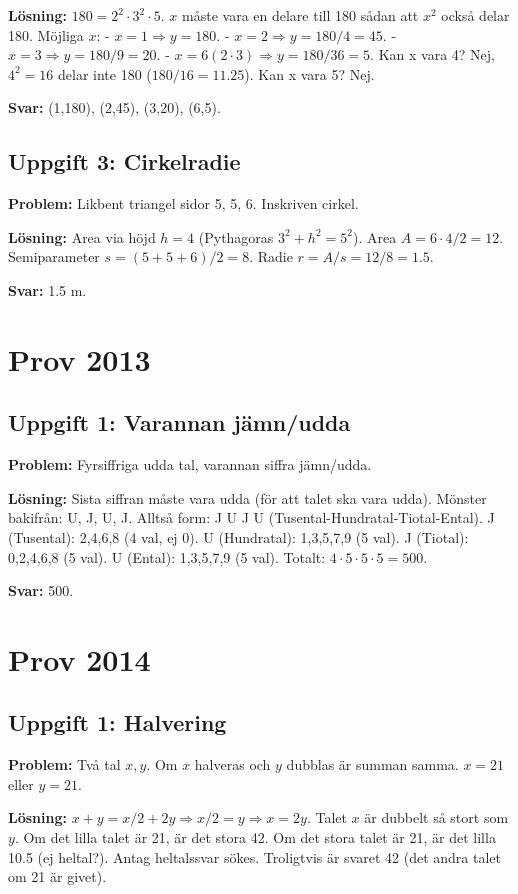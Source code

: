 \documentclass[11pt, a4paper]{article}
\begin{document}
\textbf{Lösning:}
$180 = 2^2 \cdot 3^2 \cdot 5$.
$x$ måste vara en delare till 180 sådan att $x^2$ också delar 180.
Möjliga $x$:
- $x=1 \Rightarrow y=180$.
- $x=2 \Rightarrow y=180/4=45$.
- $x=3 \Rightarrow y=180/9=20$.
- $x=6 (2\cdot3) \Rightarrow y=180/36=5$.
Kan x vara 4? Nej, $4^2=16$ delar inte 180 ($180/16 = 11.25$).
Kan x vara 5? Nej.

\textbf{Svar:} (1,180), (2,45), (3,20), (6,5).

\subsection{Uppgift 3: Cirkelradie}
\textbf{Problem:} Likbent triangel sidor 5, 5, 6. Inskriven cirkel.

\textbf{Lösning:}
Area via höjd $h=4$ (Pythagoras $3^2+h^2=5^2$). Area $A = 6 \cdot 4 / 2 = 12$.
Semiparameter $s = (5+5+6)/2 = 8$.
Radie $r = A/s = 12/8 = 1.5$.

\textbf{Svar:} 1.5 m.

\newpage

\section{Prov 2013}
\subsection{Uppgift 1: Varannan jämn/udda}
\textbf{Problem:} Fyrsiffriga udda tal, varannan siffra jämn/udda.

\textbf{Lösning:}
Sista siffran måste vara udda (för att talet ska vara udda).
Mönster bakifrån: U, J, U, J.
Alltså form: J U J U (Tusental-Hundratal-Tiotal-Ental).
J (Tusental): 2,4,6,8 (4 val, ej 0).
U (Hundratal): 1,3,5,7,9 (5 val).
J (Tiotal): 0,2,4,6,8 (5 val).
U (Ental): 1,3,5,7,9 (5 val).
Totalt: $4 \cdot 5 \cdot 5 \cdot 5 = 500$.

\textbf{Svar:} 500.

\newpage

\section{Prov 2014}
\subsection{Uppgift 1: Halvering}
\textbf{Problem:} Två tal $x, y$. Om $x$ halveras och $y$ dubblas är summan samma. $x=21$ eller $y=21$.

\textbf{Lösning:}
$x+y = x/2 + 2y \Rightarrow x/2 = y \Rightarrow x=2y$.
Talet $x$ är dubbelt så stort som $y$.
Om det lilla talet är 21, är det stora 42.
Om det stora talet är 21, är det lilla 10.5 (ej heltal?). Antag heltalssvar sökes.
Troligtvis är svaret 42 (det andra talet om 21 är givet).
\end{document}
